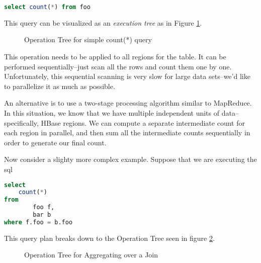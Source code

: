 \begin{lstlisting}[frame=single,captionpos=b,caption=Simple Aggregate Query,language=SQL]
select count(*) from foo
\end{lstlisting}

This query can be visualized as an \emph{execution tree} as in Figure \ref{fig:countTree}.

\begin{figure}
\caption{Operation Tree for simple count(*) query}
\label{fig:countTree}
\end{figure}

This operation needs to be applied to all regions for the table. It can be performed sequentially--just scan all the rows and count them one by one. Unfortunately, this sequential scanning is very slow for large data sets--we'd like to parallelize it as much as possible.

An alternative is to use a two-stage processing algorithm similar to MapReduce. In this situation, we know that we have multiple independent units of data--specifically, HBase regions. We can compute a separate intermediate count for each region in parallel, and then sum all the intermediate counts sequentially in order to generate our final count.

Now consider a slighty more complex example. Suppose that we are executing the sql
\begin{lstlisting}[frame=single,captionpos=b,caption=Aggregate over join,language=SQL]
select 
	count(*) 
from 
		foo f,
		bar b
where f.foo = b.foo
\end{lstlisting}
This query plan breaks down to the Operation Tree seen in figure \ref{fig:countOverJoinTree}.

\begin{figure}
\caption{Operation Tree for Aggregating over a Join}
\label{fig:countOverJoinTree}
\end{figure}

